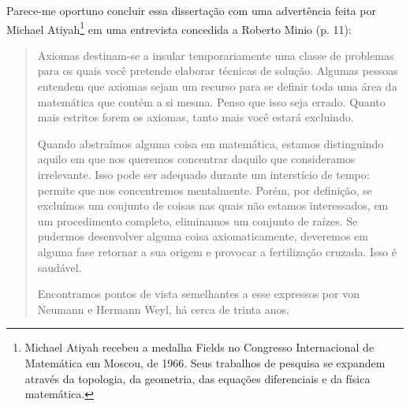 \documentclass{hipatia}
\begin{document}
Parece-me oportuno concluir essa dissertação com uma advertência feita por Michael Atiyah\footnote{Michael Atiyah recebeu a medalha Fields no Congresso Internacional de Matemática em Moscou, de 1966. Seus trabalhos de pesquisa se expandem através da topologia, da geometria, das equações diferenciais e da física matemática.
} em uma entrevista concedida a Roberto Minio  (p. 11):  
\begin{quote}
Axiomas destinam-se a insular temporariamente uma classe de problemas para os quais você pretende elaborar técnicas de solução. Algumas pessoas entendem que axiomas sejam um recurso para se definir toda uma área da matemática que contém a si mesma. Penso que isso seja errado. Quanto mais estritos forem os axiomas, tanto mais você estará excluindo.

Quando abstraímos alguma coisa em matemática, estamos distinguindo aquilo em que nos queremos concentrar daquilo que consideramos irrelevante. Isso pode ser adequado durante um interstício de tempo: permite que nos concentremos mentalmente. Porém, por definição, se excluímos um conjunto de coisas nas quais não estamos interessados, em um procedimento completo, eliminamos um conjunto de raízes. Se pudermos desenvolver alguma coisa axiomaticamente, deveremos em alguma fase retornar a sua origem e provocar a fertilização cruzada. Isso é saudável.

Encontramos pontos de vista semelhantes a esse expressos por von Neumann e Hermann Weyl, há cerca de trinta anos.
\end{quote}






\nocite{*}





\end{document}
